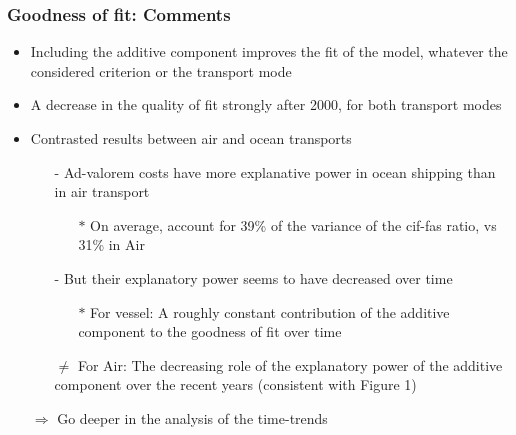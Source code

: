 \documentclass[10 pt,Helvetica, french]{beamer}
\begin{document}
\begin{frame}
\frametitle{Goodness of fit: Comments}
\begin{itemize}
\item Including the additive component improves the fit of the model, whatever the considered criterion or the transport mode \vspace{0.1cm}
\item A decrease in the quality of fit strongly after 2000, for both transport modes \vspace{0.1cm}
\item Contrasted results between air and ocean transports \vspace{0.1cm}
\begin{itemize}
\item[-] Ad-valorem costs have more explanative power in ocean shipping than in air transport \vspace{0.1cm}
\begin{itemize}
\item[$\ast$] On average, account for 39\% of the variance of the cif-fas ratio, vs 31\% in Air \vspace{0.1cm}
\end{itemize}
\item[-] But their explanatory power seems to have decreased over time \vspace{0.1cm}
\begin{itemize}
\item[$\ast$] For vessel: A roughly constant contribution of the additive component to the goodness of fit over time\vspace{0.1cm}
\end{itemize}
\item[$\neq$] For Air: The decreasing role of the explanatory power of the additive component over the recent years (consistent with Figure 1)\vspace{0.1cm}
\end{itemize}
\item[$\Rightarrow$] Go deeper in the analysis of the time-trends
\end{itemize}
\hyperlink{slide_goodnessfit}{}
\end{frame}
\end{document}
